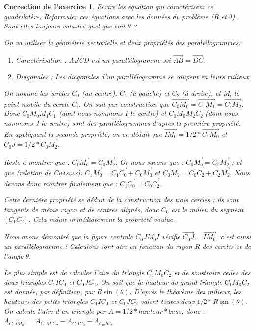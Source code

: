 \documentclass[12pt]{article}
\theoremstyle{break}
\newtheorem{cor}{Correction de l'exercice}
\begin{document}
\begin{cor}
\textit{Ecrire les équation qui caractérisent ce quadrilatère. Reformuler ces équations avec les données du problème (R et $\theta$). Sont-elles toujours valables quel que soit $\theta$ ? }

On va utiliser la géométrie vectorielle et deux propriétés des parallélogrammes:\begin{enumerate}
\item \textit{Caractérisation} : ABCD est un parallélogramme ssi $\overrightarrow{AB} = \overrightarrow{DC}$.
\item \textit{Diagonales} : Les diagonales d'un parallélogramme se coupent en leurs milieux.
\end{enumerate}

On nomme les cercles $C_0$ (au centre), $C_1$ (à gauche) et $C_2$ (à droite), et $M_i$ le point mobile du cercle $C_i$. On sait par construction que $\overrightarrow{C_0 M_0} = \overrightarrow{C_1 M_1} = \overrightarrow{C_2 M_2}$. Donc $C_0 M_0 M_1 C_1$ (dont nous nommons $I$ le centre) et $C_0 M_0 M_2 C_2$ (dont nous nommons $J$ le centre) sont des parallélogrammes d'après la première propriété. En appliquant la seconde propriété, on en déduit que $\overrightarrow{I M_0} = 1/2 * \overrightarrow{C_1 M_0}$ et $\overrightarrow{C_0 J} = 1/2 * \overrightarrow{C_0 M_2}$.

Reste à montrer que : $\overrightarrow{C_1 M_0} = \overrightarrow{C_0 M_2}$. Or nous savons que : $\overrightarrow{C_0 M_0} = \overrightarrow{C_2 M_2}$ ; et que (relation de \textsc{Chasles}): $\overrightarrow{C_1 M_0} = \overrightarrow{C_1 C_0} + \overrightarrow{C_0 M_0}$ et $\overrightarrow{C_0 M_2} = \overrightarrow{C_0 C_2} + \overrightarrow{C_2 M_2}$. Nous devons donc montrer finalement que : $\overrightarrow{C_1 C_0} = \overrightarrow{C_0 C_2}$.

Cette dernière propriété se déduit de la construction des trois cercles : ils sont tangents de même rayon et de centres alignés, donc $C_0$ est le milieu du segment $[C_1 C_2]$. Cela induit immédiatement la propriété voulue.

Nous avons démontré que la figure centrale $C_0 J M_0 I$ vérifie $\overrightarrow{C_0 J} = \overrightarrow{I M_0}$, c'est ainsi un parallélogramme ! Calculons sont aire en fonction du rayon $R$ des cercles et de l'angle $\theta$.

Le plus simple est de calculer l'aire du triangle $C_1 M_0 C_2$ et de soustraire celles des deux triangles $C_1 I C_0$ et $C_0 J C_2$. On sait que la hauteur du grand triangle $C_1 M_0 C_2$ est donnée, par définition, par $R \sin(\theta)$. D'après le théorème des milieux, les hauteurs des petits triangles $C_1 I C_0$ et $C_0 J C_2$ valent toutes deux $1/2 * R \sin(\theta)$. On calcule l'aire d'un triangle par $A = 1/2 * hauteur * base$, donc :
$A_{C_0 J M_0 I} = A_{C_1 M_0 C_2} - A_{C_1 I C_0} - A_{C_0 J C_2}$


\end{cor}
\end{document}
